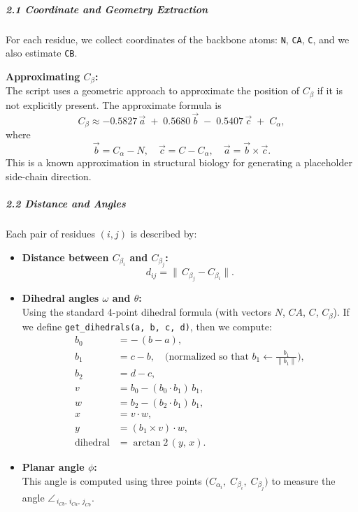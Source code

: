 \documentclass[11pt]{article}
\begin{document}
\subparagraph{2.1 Coordinate and Geometry Extraction}

For each residue, we collect coordinates of the backbone atoms: \texttt{N}, \texttt{CA}, \texttt{C}, and we also estimate \texttt{CB}.

\textbf{Approximating \( C_\beta \):}\\[1ex]
The script uses a geometric approach to approximate the position of \( C_\beta \) if it is not explicitly present. The approximate formula is
\[
C_\beta \approx -0.5827\,\vec{a} \;+\; 0.5680\,\vec{b} \;-\; 0.5407\,\vec{c} \;+\; C_\alpha,
\]
where
\[
\vec{b} = C_\alpha - N,\quad \vec{c} = C - C_\alpha,\quad \vec{a} = \vec{b} \times \vec{c}.
\]
This is a known approximation in structural biology for generating a placeholder side-chain direction.

\subparagraph{2.2 Distance and Angles}

Each pair of residues $(i, j)$ is described by:

\begin{itemize}
  \item \textbf{Distance between \( C_{\beta_i} \) and \( C_{\beta_j} \):}
    \[
    d_{ij} = \|\,C_{\beta_j} - C_{\beta_i}\|.
    \]
  \item \textbf{Dihedral angles \(\omega\) and \(\theta\):}\\[1ex]
    Using the standard 4-point dihedral formula (with vectors \(N\), \(CA\), \(C\), \(C_\beta\)). If we define \texttt{get\_dihedrals(a, b, c, d)}, then we compute:
    \[
    \begin{aligned}
    b_0 &= -\,(b - a), \\
    b_1 &= c - b,\quad \text{(normalized so that } b_1 \leftarrow \frac{b_1}{\|b_1\|}\text{)}, \\
    b_2 &= d - c, \\
    v &= b_0 - (b_0 \cdot b_1)\,b_1, \\
    w &= b_2 - (b_2 \cdot b_1)\,b_1, \\
    x &= v \cdot w, \\
    y &= (b_1 \times v) \cdot w, \\
    \text{dihedral} &= \arctan2\,(y,\,x).
    \end{aligned}
    \]
  \item \textbf{Planar angle \(\phi\):}\\[1ex]
    This angle is computed using three points \(\bigl(C_{\alpha_i},\; C_{\beta_i},\; C_{\beta_j}\bigr)\) to measure the angle \(\angle_{\,i_{Cb},\,i_{Ca},\,j_{Cb}}\).
\end{itemize}
\end{document}
